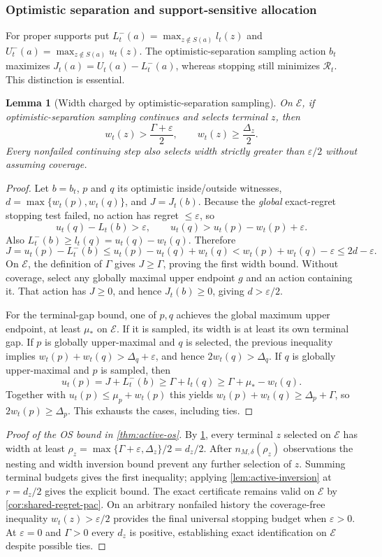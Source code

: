 \documentclass{article}
\theoremstyle{plain}
\newtheorem{lemma}[theorem]{Lemma}
\theoremstyle{definition}
\begin{document}
\subsubsection{Optimistic separation and support-sensitive allocation}
For proper supports put $L_t^-(a)=\max_{z\notin S(a)}l_t(z)$ and $U_t^-(a)=\max_{z\notin S(a)}u_t(z)$. The optimistic-separation sampling action $b_t$ maximizes $J_t(a)=U_t(a)-L_t^-(a)$, whereas stopping still minimizes $\mathcal R_t$. This distinction is essential.
\begin{lemma}[Width charged by optimistic-separation sampling]
\label{lem:active-os-width}
On $\mathcal E$, if optimistic-separation sampling continues and selects terminal $z$, then
\[
 w_t(z)>\frac{\Gamma+\varepsilon}{2},\qquad
 w_t(z)\ge\frac{\Delta_z}{2}.
\]
Every nonfailed continuing step also selects width strictly greater than $\varepsilon/2$ without assuming coverage.
\end{lemma}
\begin{proof}
Let $b=b_t$, $p$ and $q$ its optimistic inside/outside witnesses, $d=\max\{w_t(p),w_t(q)\}$, and $J=J_t(b)$. Because the \emph{global} exact-regret stopping test failed, no action has regret $\le\varepsilon$, so
\[
 u_t(q)-L_t(b)>\varepsilon,\qquad
 u_t(q)>u_t(p)-w_t(p)+\varepsilon.
\]
Also $L_t^-(b)\ge l_t(q)=u_t(q)-w_t(q)$. Therefore
\[
 J=u_t(p)-L_t^-(b)\le u_t(p)-u_t(q)+w_t(q)
 <w_t(p)+w_t(q)-\varepsilon\le2d-\varepsilon.
\]
On $\mathcal E$, the definition of $\Gamma$ gives $J\ge\Gamma$, proving the first width bound. Without coverage, select any globally maximal upper endpoint $g$ and an action containing it. That action has $J\ge0$, and hence $J_t(b)\ge0$, giving $d>\varepsilon/2$.

For the terminal-gap bound, one of $p,q$ achieves the global maximum upper endpoint, at least $\mu_*$ on $\mathcal E$. If it is sampled, its width is at least its own terminal gap. If $p$ is globally upper-maximal and $q$ is selected, the previous inequality implies $w_t(p)+w_t(q)>\Delta_q+\varepsilon$, and hence $2w_t(q)>\Delta_q$. If $q$ is globally upper-maximal and $p$ is sampled, then
\[
 u_t(p)=J+L_t^-(b)\ge\Gamma+l_t(q)
 \ge\Gamma+\mu_*-w_t(q).
\]
Together with $u_t(p)\le\mu_p+w_t(p)$ this yields $w_t(p)+w_t(q)\ge\Delta_p+\Gamma$, so $2w_t(p)\ge\Delta_p$. This exhausts the cases, including ties.
\end{proof}
\begin{proof}[Proof of the OS bound in \cref{thm:active-os}]
By \cref{lem:active-os-width}, every terminal $z$ selected on $\mathcal E$ has width at least
$\rho_z=\max\{\Gamma+\varepsilon,\Delta_z\}/2=d_z/2$.
After $n_{M,\delta}(\rho_z)$ observations the nesting and width inversion bound prevent any further selection of $z$. Summing terminal budgets gives the first inequality; applying \cref{lem:active-inversion} at $r=d_z/2$ gives the explicit bound. The exact certificate remains valid on $\mathcal E$ by \cref{cor:shared-regret-pac}. On an arbitrary nonfailed history the coverage-free inequality $w_t(z)>\varepsilon/2$ provides the final universal stopping budget when $\varepsilon>0$. At $\varepsilon=0$ and $\Gamma>0$ every $d_z$ is positive, establishing exact identification on $\mathcal E$ despite possible ties.
\end{proof}
\end{document}
